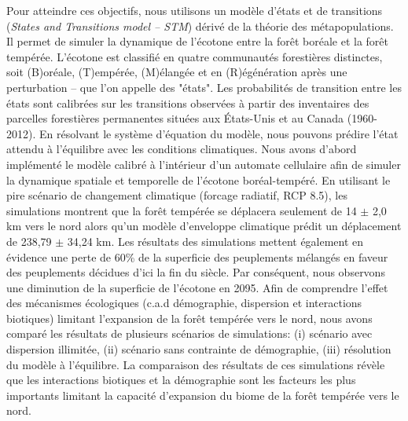 Pour atteindre ces objectifs, nous utilisons un modèle d'états et de transitions (\textit{States and
Transitions model -- STM}) dérivé de la théorie des métapopulations. Il permet de simuler la
dynamique de l'écotone entre la forêt boréale et la forêt tempérée. L'écotone est classifié en
quatre communautés forestières distinctes, soit (B)oréale, (T)empérée, (M)élangée et en
(R)égénération après une perturbation -- que l'on appelle des "états". Les probabilités de transition
entre les états sont calibrées sur les transitions observées à partir des inventaires des parcelles
forestières permanentes situées aux États-Unis et au Canada (1960-2012). En résolvant le système
d'équation du modèle, nous pouvons prédire l'état attendu à l'équilibre avec les conditions
climatiques. Nous avons d'abord implémenté le modèle calibré à l'intérieur d'un automate cellulaire
afin de simuler la dynamique spatiale et temporelle de l'écotone boréal-tempéré. En utilisant le
pire scénario de changement climatique (forcage radiatif, RCP 8.5), les simulations montrent que la
forêt tempérée se déplacera seulement de 14 $\pm$ 2,0 km vers le nord alors qu'un modèle d'enveloppe
climatique prédit un déplacement de 238,79 $\pm$ 34,24 km. Les résultats des simulations mettent
également en évidence une perte de 60\% de la superficie des peuplements mélangés en faveur des
peuplements décidues d’ici la fin du siècle. Par conséquent, nous observons une diminution de la
superficie de l'écotone en 2095. Afin de comprendre l'effet des mécanismes écologiques (c.a.d
démographie, dispersion et interactions biotiques) limitant l'expansion de la forêt tempérée vers le
nord, nous avons comparé les résultats de plusieurs scénarios de simulations: (i) scénario avec
dispersion illimitée, (ii) scénario sans contrainte de démographie, (iii) résolution du modèle à
l'équilibre. La comparaison des résultats de ces simulations révèle que les interactions biotiques
et la démographie sont les facteurs les plus importants limitant la capacité d'expansion du biome de
la forêt tempérée vers le nord.


